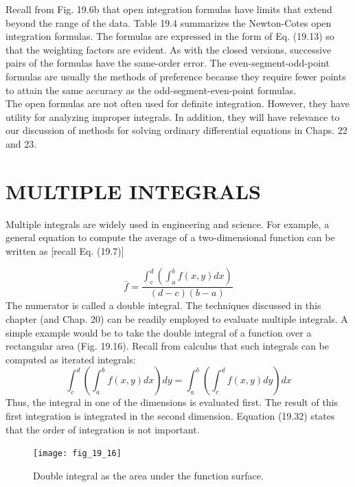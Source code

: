 \documentclass[../main.tex]{subfiles}
\begin{document}
Recall from Fig. 19.6b that open integration formulas have limits that extend beyond the
range of the data. Table 19.4 summarizes the Newton-Cotes open integration formulas. The
formulas are expressed in the form of Eq. (19.13) so that the weighting factors are evident.
As with the closed versions, successive pairs of the formulas have the same-order error.
The even-segment-odd-point formulas are usually the methods of preference because they
require fewer points to attain the same accuracy as the odd-segment-even-point formulas.\\
The open formulas are not often used for definite integration. However, they have utility for analyzing improper integrals. In addition, they will have relevance to our discussion
of methods for solving ordinary differential equations in Chaps. 22 and 23.
\vspace{1cm}
\section{MULTIPLE INTEGRALS}
Multiple integrals are widely used in engineering and science. For example, a general
equation to compute the average of a two-dimensional function can be written as [recall
Eq. (19.7)]

\begin{equation}
    \tag{19.31}
\bar{f}=\frac{\int_{c}^{d}\left(\int_{a}^{b} f(x, y) d x\right)}{(d-c)(b-a)}
\end{equation}
The numerator is called a double integral.
The techniques discussed in this chapter (and Chap. 20) can be readily employed to evaluate multiple integrals. A simple example would be to take the double integral of a function over a rectangular area (Fig. 19.16).
Recall from calculus that such integrals can be computed as iterated integrals:
\begin{equation}
    \tag{19.32}
\int_{c}^{d}\left(\int_{a}^{b} f(x, y) d x\right) d y=\int_{a}^{b}\left(\int_{c}^{d} f(x, y) d y\right) d x
\end{equation}
Thus, the integral in one of the dimensions is evaluated first. The result of this first integration is integrated in the second dimension. Equation (19.32) states that the order of integration is not important.

\begin{figure}[H]
    \centering
    \texttt{[image: fig\_19\_16]}
   \caption{\textsf{Double integral as the area under the function surface.}}\label{fig:fig_19_16}
\end{figure}
\end{document}

